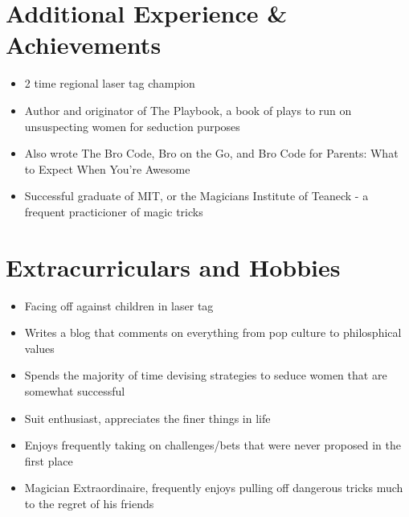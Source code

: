 \documentclass[letterpaper,10pt]{article}
\newcommand{\resumeSubHeadingListStart}{\begin{itemize}[leftmargin=*]}
\newcommand{\resumeSubHeadingListEnd}{\end{itemize}}
\newcommand{\shorterSection}[1]{\vspace{-10pt}\section{#1}}
\begin{document}
\shorterSection{Additional Experience \& Achievements}
  \resumeSubHeadingListStart
  \small
    \item{2 time regional laser tag champion}
    \vspace{-5pt}
    \item{Author and originator of The Playbook, a book of plays to run on unsuspecting women for seduction purposes}
    \vspace{-5pt}
    \item{Also wrote The Bro Code, Bro on the Go, and Bro Code for Parents: What to Expect When You're Awesome}
    \vspace{-5pt}
    \item{Successful graduate of MIT, or the Magicians Institute of Teaneck - a frequent practicioner of magic tricks}
  \resumeSubHeadingListEnd
\shorterSection{Extracurriculars and Hobbies}
  \resumeSubHeadingListStart
  \small
    \item{Facing off against children in laser tag}
    \vspace{-5pt}
    \item{Writes a blog that comments on everything from pop culture to philosphical values}
    \vspace{-5pt}
    \item{Spends the majority of time devising strategies to seduce women that are somewhat successful}
    \vspace{-5pt}
    \item{Suit enthusiast, appreciates the finer things in life}
    \vspace{-5pt}
    \item{Enjoys frequently taking on challenges/bets that were never proposed in the first place}
    \item{Magician Extraordinaire, frequently enjoys pulling off dangerous tricks much to the regret of his friends}
  \resumeSubHeadingListEnd
\end{document}
